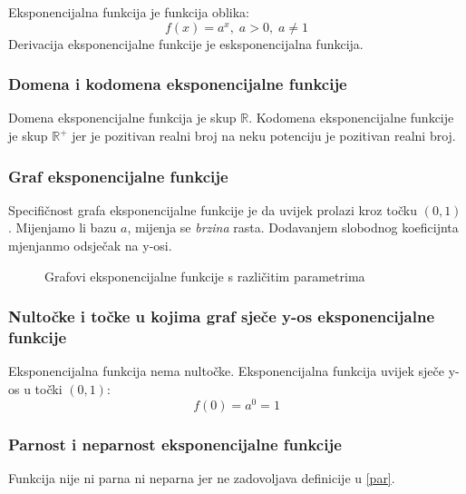 \newcommand{\eksp}{eksponencijalne funkcije}
    Eksponencijalna funkcija je funkcija oblika:
    \[f(x) = a^x,\;a > 0,\; a \neq 1\]
    \noindent Derivacija eksponencijalne funkcije je esksponencijalna funkcija.

\subsubsection{Domena i kodomena \eksp}
    Domena eksponencijalne funkcija je skup \(\mathbb{R}\).
    Kodomena eksponencijalne funkcije je skup \(\mathbb{R^+}\) jer je pozitivan realni broj na neku potenciju je pozitivan realni broj.

\subsubsection{Graf \eksp}
    Specifičnost grafa eksponencijalne funkcije je da uvijek prolazi kroz točku \((0, 1)\).
    Mijenjamo li bazu \(a\), mijenja se \emph{brzina} rasta. Dodavanjem slobodnog koeficijnta mjenjanmo odsječak na y-osi.
    \begin{figure}[ht]
        \centering
        \caption{Grafovi eksponencijalne funkcije s različitim parametrima}
        \label{fig:template}
    \end{figure}

\subsubsection{Nultočke i točke u kojima graf sječe y-os \eksp}
    Eksponencijalna funkcija nema nultočke.
    Eksponencijalna funkcija uvijek sječe y-os u točki \((0, 1)\):
    \[f(0) = a^0 = 1\]

\subsubsection{Parnost i neparnost \eksp}
    Funkcija nije ni parna ni neparna jer ne zadovoljava definicije u \ref{par}.

